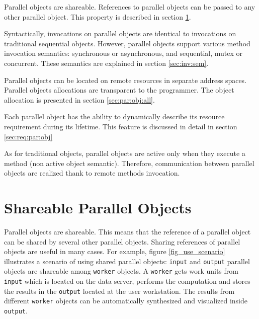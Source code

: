 \begin{petitem}

\item Parallel objects are shareable. References to parallel objects can
       be passed to any other parallel object. This property is described in section \ref{sec:shar:par:obj}.

\item Syntactically, invocations on parallel objects are identical to
       invocations on traditional sequential objects. However, parallel
       objects support various method invocation semantics: synchronous
       or asynchronous, and sequential, mutex or concurrent. These
       semantics are explained in section \ref{sec:inv:sem}.

\item Parallel objects can be located on remote resources in separate
       address spaces. Parallel objects allocations are transparent to
       the programmer. The object allocation is presented in section
       \ref{sec:par:obj:all}.

\item Each parallel object has the ability to dynamically describe its
       resource requirement during its lifetime. This feature is
       discussed in detail in section \ref{sec:req:par:obj}

\end{petitem}

As for traditional objects, parallel objects are active only when they execute
a method (non active object semantic). Therefore, communication between
parallel objects are realized thank to remote methods invocation.


\section{Shareable Parallel Objects}\label{sec:shar:par:obj}

Parallel objects are shareable. This means that the reference of a
parallel object can be shared by several other parallel objects.
Sharing references of parallel objects are useful in many cases.
For example, figure \ref{fig_use_scenario} illustrates a scenario of
using shared parallel objects: \texttt{input} and \texttt{output}
parallel objects are shareable among \texttt{worker} objects.
A \texttt{worker} gets work
units from \texttt{input} which is located on the data server, performs
the computation and stores the results in the \texttt{output} located at
the user workstation. The results from different \texttt{worker} objects
can be automatically synthesized and visualized inside \texttt{output}.

